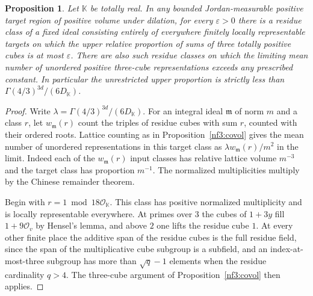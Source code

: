 \documentclass[11pt,letterpaper]{article}
\newtheorem{proposition}[proposition]{Proposition}
\theoremstyle{definition}
\numberwithin{equation}{section}
\begin{document}
\begin{proposition}\label{nf3:prog}
Let $\mathbb K$ be totally real. In any bounded Jordan-measurable
positive target region of positive volume under dilation, for every
$\varepsilon>0$ there is a residue class of a fixed ideal consisting
entirely of everywhere finitely locally representable targets on which
the upper relative proportion of sums of three totally positive
cubes is at most $\varepsilon$. There are also such residue classes
on which the limiting mean number of unordered positive three-cube
representations exceeds any prescribed constant. In particular the
unrestricted upper proportion is strictly less than
$\Gamma(4/3)^{3d}/(6D_{\mathbb K})$.
\end{proposition}
\begin{proof}
Write $\lambda=\Gamma(4/3)^{3d}/(6D_{\mathbb K})$.
For an integral ideal $\mathfrak m$ of norm $m$ and a class $r$, let
$w_{\mathfrak m}(r)$ count the triples of residue cubes with sum $r$,
counted with their ordered roots. Lattice counting as in
Proposition~\ref{nf3:covol} gives the mean number of unordered
representations in this target class as $\lambda w_{\mathfrak m}(r)/m^2$
in the limit. Indeed each of the $w_{\mathfrak m}(r)$ input classes has
relative lattice volume $m^{-3}$ and the target class has proportion $m^{-1}$.
The normalized multiplicities multiply by the Chinese remainder theorem.

Begin with $r=1\bmod18\mathcal O_{\mathbb K}$. This class has positive
normalized multiplicity and is locally representable everywhere.
At primes over $3$ the cubes of $1+3y$ fill $1+9\mathcal O_v$ by
Hensel's lemma, and above $2$ one lifts the residue cube $1$.
At every other finite place the additive span of the residue cubes is
the full residue field, since the span of the multiplicative cube subgroup is
a subfield, and an index-at-most-three subgroup has more than
$\sqrt q-1$ elements when the residue cardinality $q>4$.
The three-cube argument of Proposition~\ref{nf3:covol} then applies.


\end{proof}
\end{document}
